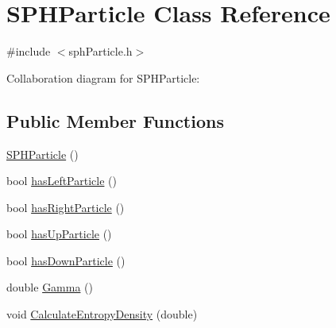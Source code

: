 \hypertarget{classSPHParticle}{}\section{S\+P\+H\+Particle Class Reference}
\label{classSPHParticle}


{\ttfamily \#include $<$sph\+Particle.\+h$>$}



Collaboration diagram for S\+P\+H\+Particle\+:
\subsection*{Public Member Functions}
\begin{DoxyCompactItemize}
\item 
\hyperlink{classSPHParticle_a0358b0e53801799041387090391aa968}{S\+P\+H\+Particle} ()
\item 
bool \hyperlink{classSPHParticle_ab794d122ef1af838ce239e16b184c91b}{has\+Left\+Particle} ()
\item 
bool \hyperlink{classSPHParticle_a3742412e4a200f8610ad69188d149003}{has\+Right\+Particle} ()
\item 
bool \hyperlink{classSPHParticle_ae5f57cb17d2e2babfab4e8d3a91eb259}{has\+Up\+Particle} ()
\item 
bool \hyperlink{classSPHParticle_a56ce2c5fa775655e290c9fd49f214194}{has\+Down\+Particle} ()
\item 
double \hyperlink{classSPHParticle_a64fe0b1c9b587542d60a2ab83606402d}{Gamma} ()
\item 
void \hyperlink{classSPHParticle_a04937ac7d79bcef7093ec56462b5f37e}{Calculate\+Entropy\+Density} (double)
\end{DoxyCompactItemize}
